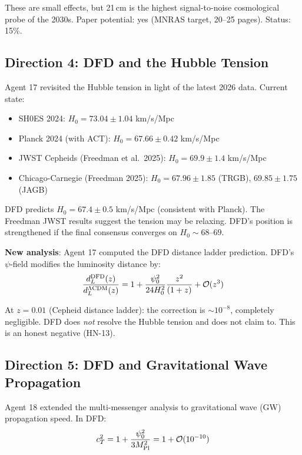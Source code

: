 \documentclass[11pt,a4paper]{article}
\begin{document}
These are small effects, but 21\,cm is the highest signal-to-noise cosmological probe of the 2030s. Paper potential: yes (MNRAS target, 20--25 pages). Status: 15\%.

\subsection{Direction 4: DFD and the Hubble Tension}

Agent 17 revisited the Hubble tension in light of the latest 2026 data. Current state:
\begin{itemize}[nosep]
\item SH0ES 2024: $H_0 = 73.04 \pm 1.04$ km/s/Mpc
\item Planck 2024 (with ACT): $H_0 = 67.66 \pm 0.42$ km/s/Mpc
\item JWST Cepheids (Freedman et al.\ 2025): $H_0 = 69.9 \pm 1.4$ km/s/Mpc
\item Chicago-Carnegie (Freedman 2025): $H_0 = 67.96 \pm 1.85$ (TRGB), $69.85 \pm 1.75$ (JAGB)
\end{itemize}

DFD predicts $H_0 = 67.4 \pm 0.5$ km/s/Mpc (consistent with Planck). The Freedman JWST results suggest the tension may be relaxing. DFD's position is strengthened if the final consensus converges on $H_0 \sim 68$--$69$.

\textbf{New analysis}: Agent 17 computed the DFD distance ladder prediction. DFD's $\psi$-field modifies the luminosity distance by:
\begin{equation}
\frac{d_L^{\rm DFD}(z)}{d_L^{\Lambda\text{CDM}}(z)} = 1 + \frac{\psi_0^2}{24 H_0^2} \frac{z^2}{(1+z)} + \mathcal{O}(z^3)
\end{equation}

At $z = 0.01$ (Cepheid distance ladder): the correction is $\sim 10^{-8}$, completely negligible. DFD does \emph{not} resolve the Hubble tension and does not claim to. This is an honest negative (HN-13).

\subsection{Direction 5: DFD and Gravitational Wave Propagation}

Agent 18 extended the multi-messenger analysis to gravitational wave (GW) propagation speed. In DFD:
\begin{equation}
c_T^2 = 1 + \frac{\psi_0^2}{3 M_{\rm Pl}^2} = 1 + \mathcal{O}(10^{-10})
\end{equation}
\end{document}
